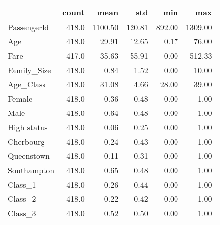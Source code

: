 \begin{tabular}{lrrrrr}
\toprule
{} &  count &     mean &     std &     min &      max \\
\midrule
PassengerId &  418.0 &  1100.50 &  120.81 &  892.00 &  1309.00 \\
Age         &  418.0 &    29.91 &   12.65 &    0.17 &    76.00 \\
Fare        &  417.0 &    35.63 &   55.91 &    0.00 &   512.33 \\
Family\_Size &  418.0 &     0.84 &    1.52 &    0.00 &    10.00 \\
Age\_Class   &  418.0 &    31.08 &    4.66 &   28.00 &    39.00 \\
Female      &  418.0 &     0.36 &    0.48 &    0.00 &     1.00 \\
Male        &  418.0 &     0.64 &    0.48 &    0.00 &     1.00 \\
High status &  418.0 &     0.06 &    0.25 &    0.00 &     1.00 \\
Cherbourg   &  418.0 &     0.24 &    0.43 &    0.00 &     1.00 \\
Queenstown  &  418.0 &     0.11 &    0.31 &    0.00 &     1.00 \\
Southampton &  418.0 &     0.65 &    0.48 &    0.00 &     1.00 \\
Class\_1     &  418.0 &     0.26 &    0.44 &    0.00 &     1.00 \\
Class\_2     &  418.0 &     0.22 &    0.42 &    0.00 &     1.00 \\
Class\_3     &  418.0 &     0.52 &    0.50 &    0.00 &     1.00 \\
\bottomrule
\end{tabular}

